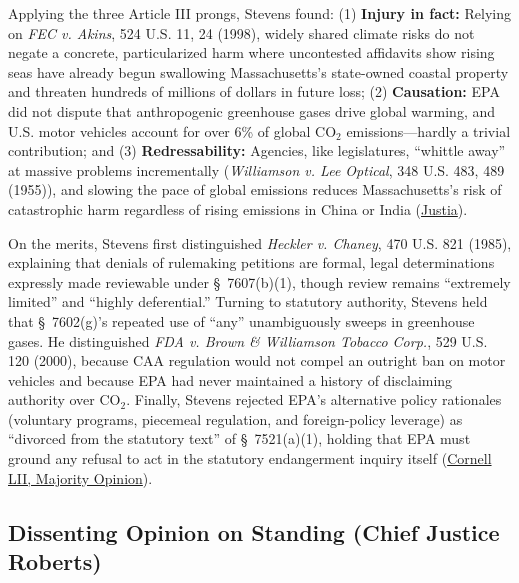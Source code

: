 \documentclass[12pt]{article}
\begin{document}
Applying the three Article III prongs, Stevens found: (1) \textbf{Injury in fact:} Relying on \textit{FEC v. Akins}, 524 U.S. 11, 24 (1998), widely shared climate risks do not negate a concrete, particularized harm where uncontested affidavits show rising seas have already begun swallowing Massachusetts's state-owned coastal property and threaten hundreds of millions of dollars in future loss; (2) \textbf{Causation:} EPA did not dispute that anthropogenic greenhouse gases drive global warming, and U.S. motor vehicles account for over 6\% of global $\mathrm{CO_2}$ emissions---hardly a trivial contribution; and (3) \textbf{Redressability:} Agencies, like legislatures, ``whittle away'' at massive problems incrementally (\textit{Williamson v. Lee Optical}, 348 U.S. 483, 489 (1955)), and slowing the pace of global emissions reduces Massachusetts's risk of catastrophic harm regardless of rising emissions in China or India (\href{https://supreme.justia.com/cases/federal/us/549/497/}{Justia}).

On the merits, Stevens first distinguished \textit{Heckler v. Chaney}, 470 U.S. 821 (1985), explaining that denials of rulemaking petitions are formal, legal determinations expressly made reviewable under \S\ 7607(b)(1), though review remains ``extremely limited'' and ``highly deferential.'' Turning to statutory authority, Stevens held that \S\ 7602(g)'s repeated use of ``any'' unambiguously sweeps in greenhouse gases. He distinguished \textit{FDA v. Brown \& Williamson Tobacco Corp.}, 529 U.S. 120 (2000), because CAA regulation would not compel an outright ban on motor vehicles and because EPA had never maintained a history of disclaiming authority over $\mathrm{CO_2}$. Finally, Stevens rejected EPA's alternative policy rationales (voluntary programs, piecemeal regulation, and foreign-policy leverage) as ``divorced from the statutory text'' of \S\ 7521(a)(1), holding that EPA must ground any refusal to act in the statutory endangerment inquiry itself (\href{https://www.law.cornell.edu/supct/html/05-1120.ZO.html}{Cornell LII, Majority Opinion}).

\subsection{Dissenting Opinion on Standing (Chief Justice Roberts)}
\end{document}
